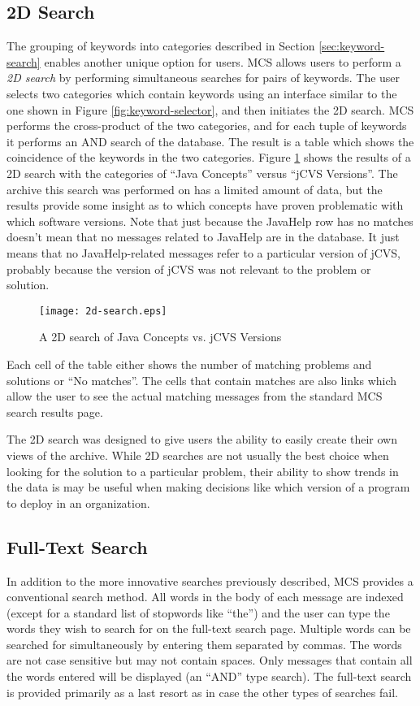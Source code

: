 \subsection{2D Search}
The grouping of keywords into categories described in Section
\ref{sec:keyword-search} enables another unique option for users. MCS allows
users to perform a {\em 2D search} by performing simultaneous searches for
pairs of keywords. The user selects two categories which contain keywords using
an interface similar to the one shown in Figure \ref{fig:keyword-selector}, and
then initiates the 2D search. MCS performs the cross-product of the two
categories, and for each tuple of keywords it performs an AND search of the
database. The result is a table which shows the coincidence of the keywords in
the two categories. Figure \ref{fig:2d-search} shows the results of a 2D search
with the categories of ``Java Concepts'' versus ``jCVS Versions''. The archive
this search was performed on has a limited amount of data, but the results
provide some insight as to which concepts have proven problematic with which
software versions. Note that just because the JavaHelp row has no matches
doesn't mean that no messages related to JavaHelp are in the database. It just
means that no JavaHelp-related messages refer to a particular version of jCVS,
probably because the version of jCVS was not relevant to the problem or
solution.

\begin{figure}[htbp]
  \centering
  \texttt{[image: 2d-search.eps]}
  \caption{A 2D search of Java Concepts vs. jCVS Versions}
  \label{fig:2d-search}
\end{figure}

Each cell of the table either shows the number of matching problems and
solutions or ``No matches''. The cells that contain matches are also links
which allow the user to see the actual matching messages from the standard MCS
search results page.

The 2D search was designed to give users the ability to easily create their own
views of the archive. While 2D searches are not usually the best choice when
looking for the solution to a particular problem, their ability to show trends
in the data is may be useful when making decisions like which version of a
program to deploy in an organization.

\subsection{Full-Text Search}
In addition to the more innovative searches previously described, MCS provides
a conventional search method. All words in the body of each message are indexed
(except for a standard list of stopwords like ``the'') and the user can type
the words they wish to search for on the full-text search page. Multiple words
can be searched for simultaneously by entering them separated by commas. The
words are not case sensitive but may not contain spaces. Only messages that
contain all the words entered will be displayed (an ``AND'' type search). The
full-text search is provided primarily as a last resort as in case the other
types of searches fail.

